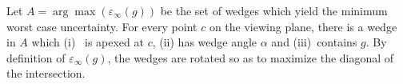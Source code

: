 
Let $A = \arg \max(\varepsilon_\infty(g))$ be the set of wedges which yield the minimum worst case uncertainty. 
For every point $c$ on the viewing plane, there is a wedge in $A$ which (i)~ is apexed at $c$, (ii) has wedge angle $\alpha$ and (iii)~contains $g$.
By definition of $\varepsilon_\infty(g)$, the wedges are rotated so as to maximize the diagonal of the intersection.

%


